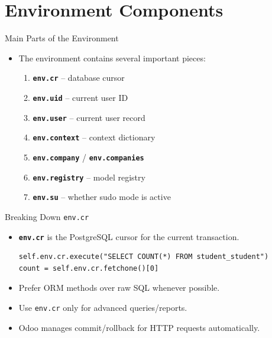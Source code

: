 \section{Environment Components}

\begin{frame}[fragile]{Main Parts of the Environment}
	\begin{itemize}
		\item The environment contains several important pieces:
		\begin{enumerate}
			\item \textbf{\texttt{env.cr}} -- database cursor
			\item \textbf{\texttt{env.uid}} -- current user ID
			\item \textbf{\texttt{env.user}} -- current user record
			\item \textbf{\texttt{env.context}} -- context dictionary
			\item \textbf{\texttt{env.company}} / \textbf{\texttt{env.companies}}
			\item \textbf{\texttt{env.registry}} -- model registry
			\item \textbf{\texttt{env.su}} -- whether sudo mode is active
		\end{enumerate}
	\end{itemize}
\end{frame}

\begin{frame}[fragile]{Breaking Down \texttt{env.cr}}
	\begin{block}{}
		\begin{itemize}
			\item \textbf{\texttt{env.cr}} is the PostgreSQL cursor for the current transaction.
\begin{lstlisting}
self.env.cr.execute("SELECT COUNT(*) FROM student_student")
count = self.env.cr.fetchone()[0]
\end{lstlisting}
			\item Prefer ORM methods over raw SQL whenever possible.
			\item Use \texttt{env.cr} only for advanced queries/reports.
			\item Odoo manages commit/rollback for HTTP requests automatically.
		\end{itemize}
	\end{block}
\end{frame}

